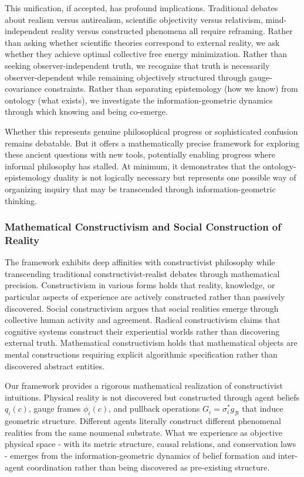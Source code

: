 \documentclass[11pt]{article}
\begin{document}
This unification, if accepted, has profound implications. Traditional debates about realism versus antirealism, scientific objectivity versus relativism, mind-independent reality versus constructed phenomena all require reframing. Rather than asking whether scientific theories correspond to external reality, we ask whether they achieve optimal collective free energy minimization. Rather than seeking observer-independent truth, we recognize that truth is necessarily observer-dependent while remaining objectively structured through gauge-covariance constraints. Rather than separating epistemology (how we know) from ontology (what exists), we investigate the information-geometric dynamics through which knowing and being co-emerge.

Whether this represents genuine philosophical progress or sophisticated confusion remains debatable. But it offers a mathematically precise framework for exploring these ancient questions with new tools, potentially enabling progress where informal philosophy has stalled. At minimum, it demonstrates that the ontology-epistemology duality is not logically necessary but represents one possible way of organizing inquiry that may be transcended through information-geometric thinking.


\subsubsection{Mathematical Constructivism and Social Construction of Reality}

The framework exhibits deep affinities with constructivist philosophy while transcending traditional constructivist-realist debates through mathematical precision. Constructivism in various forms holds that reality, knowledge, or particular aspects of experience are actively constructed rather than passively discovered. Social constructivism argues that social realities emerge through collective human activity and agreement. Radical constructivism claims that cognitive systems construct their experiential worlds rather than discovering external truth. Mathematical constructivism holds that mathematical objects are mental constructions requiring explicit algorithmic specification rather than discovered abstract entities.

Our framework provides a rigorous mathematical realization of constructivist intuitions. Physical reality is not discovered but constructed through agent beliefs $q_i(c)$, gauge frames $\phi_i(c)$, and pullback operations $G_i = \sigma_i^* g_{\mathcal{B}}$ that induce geometric structure. Different agents literally construct different phenomenal realities from the same noumenal substrate. What we experience as objective physical space - with its metric structure, causal relations, and conservation laws - emerges from the information-geometric dynamics of belief formation and inter-agent coordination rather than being discovered as pre-existing structure.
\end{document}
